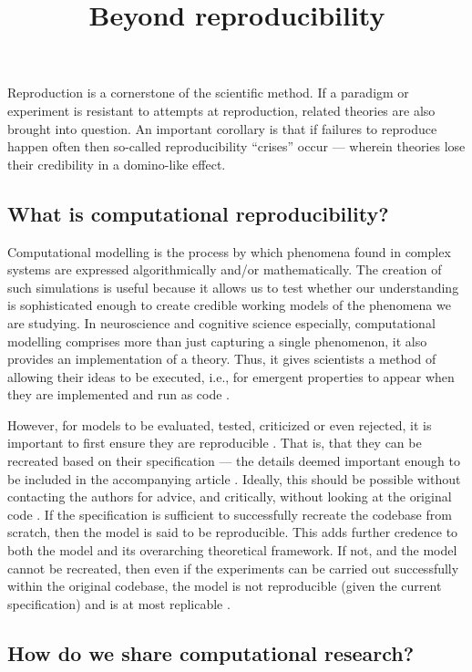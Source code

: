\documentclass[jou]{apa6}
\title{Beyond reproducibility}
\begin{document}
\maketitle

Reproduction is a cornerstone of the scientific method.
If a paradigm or experiment is resistant to attempts at reproduction, related theories are also brought into question.
An important corollary is that if failures to reproduce happen often then so-called reproducibility ``crises'' occur \cite{osc15} --- wherein theories lose their credibility in a domino-like effect.

\subsection*{What is computational reproducibility?}

Computational modelling is the process by which phenomena found in complex systems are expressed algorithmically and/or mathematically.
The creation of such simulations is useful because it allows us to test whether our understanding is sophisticated enough to create credible working models of the phenomena we are studying.
In neuroscience and cognitive science especially, computational modelling comprises more than just capturing a single phenomenon, it also provides an implementation of a theory.
Thus, it gives scientists a method of allowing their ideas to be executed, i.e., for emergent properties to appear when they are implemented and run as code \cite{mcclelland09}.

However, for models to be evaluated, tested, criticized or even rejected, it is important to first ensure they are reproducible \cite{topalidou15}.  
That is, that they can be recreated based on their specification --- the details deemed important enough to be included in the accompanying article \cite{hinsen15}.
Ideally, this should be possible without contacting the authors for advice, and critically, without looking at the original code \cite{cooper14}.
If the specification is sufficient to successfully recreate the codebase from scratch, then the model is said to be reproducible.
This adds further credence to both the model and its overarching theoretical framework.
If not, and the model cannot be recreated, then even if the experiments can be carried out successfully within the original codebase, the model is not reproducible (given the current specification) and is at most replicable \cite{crook13}.


\subsection*{How do we share computational research?}
\end{document}
